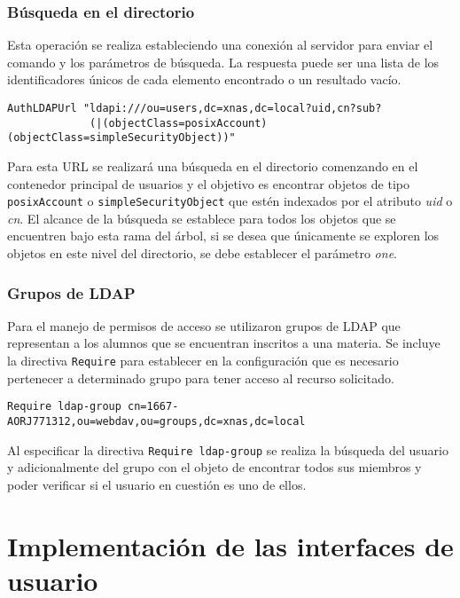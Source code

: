         \subsubsection {B\'{u}squeda en el directorio}

Esta operaci\'{o}n se realiza estableciendo una conexi\'{o}n al servidor para enviar el comando y los par\'{a}metros de b\'{u}squeda. La respuesta puede ser una lista de los identificadores \'{u}nicos de cada elemento encontrado o un resultado vac\'{i}o.

{
\footnotesize
\linespread{1}
\begin{verbatim}
AuthLDAPUrl "ldapi:///ou=users,dc=xnas,dc=local?uid,cn?sub?
             (|(objectClass=posixAccount)(objectClass=simpleSecurityObject))"
\end{verbatim}
}


Para esta URL se realizar\'{a} una b\'{u}squeda en el directorio comenzando en el contenedor principal de usuarios y el objetivo es encontrar objetos de tipo \texttt{posixAccount} o \texttt{simpleSecurityObject} que est\'{e}n indexados por el atributo \textsl{uid} o \textsl{cn}. El alcance de la b\'{u}squeda se establece para todos los objetos que se encuentren bajo esta rama del \'{a}rbol, si se desea que \'{u}nicamente se exploren los objetos en este nivel del directorio, se debe establecer el par\'{a}metro \textsl{one}.

        \subsubsection {Grupos de \textsc{LDAP}}

Para el manejo de permisos de acceso se utilizaron grupos de \textsc{LDAP} que representan a los alumnos que se encuentran inscritos a una materia. Se incluye la directiva \texttt{Require} para establecer en la configuraci\'{o}n que es necesario pertenecer a determinado grupo para tener acceso al recurso solicitado.

{
\footnotesize
\linespread{1}
\begin{verbatim}
Require ldap-group cn=1667-AORJ771312,ou=webdav,ou=groups,dc=xnas,dc=local
\end{verbatim}
}

Al especificar la directiva \texttt{Require ldap-group} se realiza la b\'{u}squeda del usuario y adicionalmente del grupo con el objeto de encontrar todos sus miembros y poder verificar si el usuario en cuesti\'{o}n es uno de ellos.


    \section {Implementaci\'{o}n de las interfaces de usuario}

